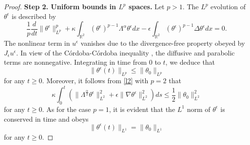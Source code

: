 \documentclass[12pt,reqno]{amsart}
\newcommand{\na}{\nabla}
\newcommand{\be}{\begin{equation}}
\newcommand{\ee}{\end{equation}}
\newcommand{\R}{\mathbb R}
\def\RR{{\mathbb R}}
\begin{document}
\begin{proof}
{\bf{Step 2. Uniform bounds in $L^p$ spaces.}} Let $p >1$.
The $L^p$ evolution of $\theta^{\epsilon}$ is described by 
\be \label{l2}
\frac{1}{p}\frac{d}{dt}\|\theta^{\epsilon}\|_{L^p}^p + \kappa \int_{\RR^2} (\theta^{\epsilon})^{p-1} \Lambda^{\alpha} \theta^{\epsilon} dx - \epsilon \int_{\R^2} 
(\theta^{\epsilon})^{p-1} \Delta \theta^{\epsilon} dx = 0.
\ee The nonlinear term in $u^{\epsilon}$ vanishes due to the divergence-free property obeyed by $J_{\epsilon} u^{\epsilon}$. In view of the C\'ordoba-C\'ordoba inequality \cite{cordoba2004maximum}, the diffusive and parabolic terms are nonnegative. Integrating in time from $0$ to $t$, we deduce that 
\be \label{ppnorm}
\|\theta^{\epsilon}(t)\|_{L^p} \le \|\theta_0\|_{L^p}
\ee for any $t \ge 0$. Moreover, it follows from \eqref{l2} with $p=2$ that
\be \label{l2e}
\kappa \int_{0}^{t} \left(\|\Lambda^{\frac{\alpha}{2}}\theta^{\epsilon}\|_{L^2}^2 + \epsilon \|\na \theta^{\epsilon}\|_{L^2}^2 \right) ds \le \frac{1}{2}\|\theta_0\|_{L^2}^2
\ee for any $t \ge 0$. As for the case $p=1$, it is evident that the $L^1$ norm of $\theta^{\epsilon}$ is conserved in time and obeys 
\be 
\|\theta^{\epsilon}(t)\|_{L^1} = \|\theta_0\|_{L^1}
\ee for any $t \ge 0$. 


\end{proof}
\end{document}
